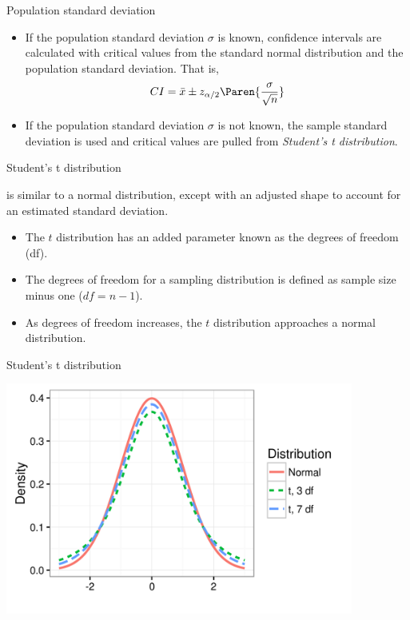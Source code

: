 \documentclass[xcolor=table, handout]{beamer}
\begin{document}
\begin{frame}{Population standard deviation}
\begin{block}{}
\large
\begin{itemize}
\item If the population standard deviation $\sigma$ is known, confidence intervals are calculated with critical values from the standard normal distribution and the population standard deviation. That is,
\[CI = \bar x \pm z_{\alpha/2} \Paren{\frac \sigma {\sqrt{n}}}\] 
\pause\item If the population standard deviation $\sigma$ is not known, the sample standard deviation is used and critical values are pulled from \emph{Student's t distribution}.
\end{itemize}
\end{block}
\end{frame}

\begin{frame}{Student's t distribution}
\begin{block}{}
\large
{} is similar to a normal distribution, except with an adjusted shape to account for an estimated standard deviation.\\
\begin{itemize}
\pause\item The $t$ distribution has an added parameter known as the degrees of freedom (df).
\pause\item The degrees of freedom for a sampling distribution is defined as sample size minus one ($df = n-1$).
\pause\item As degrees of freedom increases, the $t$ distribution approaches a normal distribution.
\end{itemize} 
\end{block}
\end{frame}

\begin{frame}{Student's t distribution}
\medskip
{\centering
\includegraphics[width=4.5in]{../images/ch7_t_dist}
\par}
\end{frame}
\end{document}
